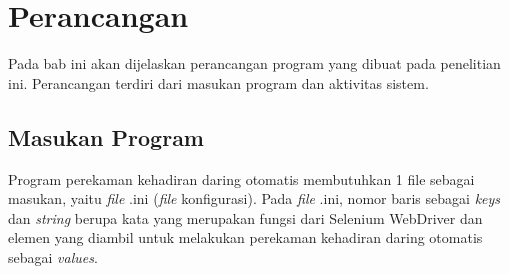 \chapter{Perancangan}
\label{chap:perancangan}
Pada bab ini akan dijelaskan perancangan program yang dibuat pada penelitian ini. Perancangan terdiri dari masukan program dan aktivitas sistem. 

\section{Masukan Program}
\label{sec:inputConfig} 
Program perekaman kehadiran daring otomatis membutuhkan 1 file sebagai masukan, yaitu \textit{file} .ini (\textit{file} konfigurasi). Pada \textit{file} .ini, nomor baris sebagai \textit{keys} dan \textit{string} berupa kata yang merupakan fungsi dari Selenium WebDriver dan elemen yang diambil untuk melakukan perekaman kehadiran daring otomatis sebagai \textit{values}. 

